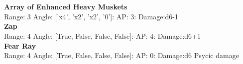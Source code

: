 \ \\

\ \\
{\bf Array of Enhanced Heavy Muskets } \\



Range: 3  Angle: ['x4', 'x2', 'x2', '0']: AP: 3: Damage:d6-1 \\




{\bf Zap } \\



Range: 4  Angle: [True, False, False, False]: AP: 4: Damage:d6+1 \\




{\bf Fear Ray } \\



Range: 4  Angle: [True, False, False, False]: AP: 0: Damage:d6 Psycic damage \\




 
\ \\



